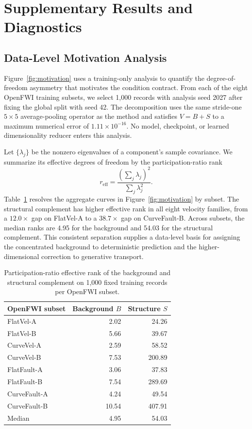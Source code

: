 \documentclass[letterpaper]{article}
\begin{document}
\section{Supplementary Results and Diagnostics}
\label{app:supplementary-results}

\subsection{Data-Level Motivation Analysis}
Figure~\ref{fig:motivation} uses a training-only analysis to quantify the degree-of-freedom asymmetry that motivates the condition contract. From each of the eight OpenFWI training subsets, we select 1,000 records with analysis seed 2027 after fixing the global split with seed 42. The decomposition uses the same stride-one $5\times5$ average-pooling operator as the method and satisfies $V=B+S$ to a maximum numerical error of $1.11\times10^{-16}$. No model, checkpoint, or learned dimensionality reducer enters this analysis.

Let $\{\lambda_j\}$ be the nonzero eigenvalues of a component's sample covariance. We summarize its effective degrees of freedom by the participation-ratio rank
\begin{equation}
r_{\mathrm{eff}}=\frac{\left(\sum_j\lambda_j\right)^2}{\sum_j\lambda_j^2}.
\label{eq:effective-rank}
\end{equation}
Table~\ref{tab:effective-rank} resolves the aggregate curves in Figure~\ref{fig:motivation} by subset. The structural complement has higher effective rank in all eight velocity families, from a $12.0\times$ gap on FlatVel-A to a $38.7\times$ gap on CurveFault-B. Across subsets, the median ranks are 4.95 for the background and 54.03 for the structural complement. This consistent separation supplies a data-level basis for assigning the concentrated background to deterministic prediction and the higher-dimensional correction to generative transport.

\begin{table}[H]
\centering
\small
\begin{tabular}{@{}lrr@{}}
\toprule
OpenFWI subset & Background $B$ & Structure $S$ \\
\midrule
FlatVel-A & 2.02 & 24.26 \\
FlatVel-B & 5.66 & 39.67 \\
CurveVel-A & 2.59 & 58.52 \\
CurveVel-B & 7.53 & 200.89 \\
FlatFault-A & 3.06 & 37.83 \\
FlatFault-B & 7.54 & 289.69 \\
CurveFault-A & 4.24 & 49.54 \\
CurveFault-B & 10.54 & 407.91 \\
\midrule
Median & 4.95 & 54.03 \\
\bottomrule
\end{tabular}
\caption{Participation-ratio effective rank of the background and structural complement on 1,000 fixed training records per OpenFWI subset.}
\label{tab:effective-rank}
\end{table}
\end{document}
